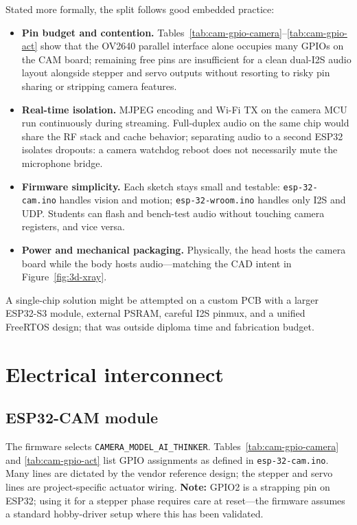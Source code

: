 \documentclass[12pt,a4paper]{report}
\begin{document}
Stated more formally, the split follows good embedded practice:

\begin{itemize}
    \item \textbf{Pin budget and contention.} Tables~\ref{tab:cam-gpio-camera}--\ref{tab:cam-gpio-act} show that the OV2640 parallel interface alone occupies many GPIOs on the CAM board; remaining free pins are insufficient for a clean dual-I2S audio layout alongside stepper and servo outputs without resorting to risky pin sharing or stripping camera features.
    \item \textbf{Real-time isolation.} MJPEG encoding and Wi-Fi TX on the camera MCU run continuously during streaming. Full-duplex audio on the same chip would share the RF stack and cache behavior; separating audio to a second ESP32 isolates dropouts: a camera watchdog reboot does not necessarily mute the microphone bridge.
    \item \textbf{Firmware simplicity.} Each sketch stays small and testable: \texttt{esp-32-cam.ino} handles vision and motion; \texttt{esp-32-wroom.ino} handles only I2S and UDP. Students can flash and bench-test audio without touching camera registers, and vice versa.
    \item \textbf{Power and mechanical packaging.} Physically, the head hosts the camera board while the body hosts audio---matching the CAD intent in Figure~\ref{fig:3d-xray}.
\end{itemize}

A single-chip solution might be attempted on a custom PCB with a larger ESP32-S3 module, external PSRAM, careful I2S pinmux, and a unified FreeRTOS design; that was outside diploma time and fabrication budget.

\section{Electrical interconnect}

\subsection{ESP32-CAM module}

The firmware selects \texttt{CAMERA\_MODEL\_AI\_THINKER}. Tables~\ref{tab:cam-gpio-camera} and \ref{tab:cam-gpio-act} list GPIO assignments as defined in \texttt{esp-32-cam.ino}. Many lines are dictated by the vendor reference design; the stepper and servo lines are project-specific actuator wiring. \textbf{Note:} GPIO2 is a strapping pin on ESP32; using it for a stepper phase requires care at reset---the firmware assumes a standard hobby-driver setup where this has been validated.
\end{document}

